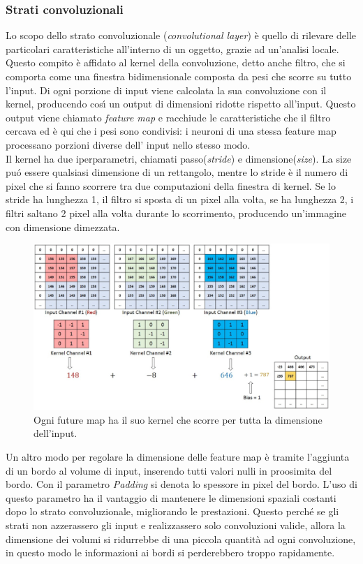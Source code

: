\documentclass[a4paper,12pt]{report}
\begin{document}
\subsubsection{Strati convoluzionali}
Lo scopo dello strato convoluzionale (\textit{convolutional layer}) \`e quello di rilevare delle particolari caratteristiche all'interno di un oggetto, grazie ad un'analisi locale. Questo compito \`e affidato al kernel della convoluzione, detto anche filtro, che si comporta come una finestra bidimensionale composta da pesi che scorre su tutto l'input. Di ogni porzione di input viene calcolata la sua convoluzione con il kernel, producendo cos\'{\i} un output di dimensioni ridotte rispetto all'input. Questo output viene chiamato \textit{feature map} e racchiude le caratteristiche che il filtro cercava ed \`e qui che i pesi sono condivisi: i neuroni di una stessa feature map processano porzioni diverse dell' input nello stesso modo.\\
Il kernel ha due iperparametri, chiamati passo(\textit{stride}) e dimensione(\textit{size}). La size  pu\'{o} essere qualsiasi dimensione di un rettangolo, mentre lo stride \`e il numero di pixel che si fanno scorrere tra due computazioni della finestra di kernel. Se lo stride ha lunghezza 1, il filtro si sposta di un pixel alla volta, se ha lunghezza 2, i filtri saltano 2 pixel alla volta durante lo scorrimento, producendo un'immagine con dimensione dimezzata.
\newpage
\begin{figure}[!ht]
\centering
\includegraphics[scale=0.5]{finestra}
\caption{Ogni future map ha il suo kernel che scorre per tutta la dimensione dell'input.}
\end{figure}
Un altro modo per regolare la dimensione delle feature map \`e tramite l'aggiunta di un bordo al volume di input, inserendo tutti valori nulli in proosimita del bordo. Con il parametro \textit{Padding} si denota lo spessore in pixel del bordo. L'uso di questo parametro ha il vantaggio di mantenere le dimensioni spaziali costanti dopo lo strato convoluzionale, migliorando le prestazioni. Questo perch\'{e} se gli strati non azzerassero gli input e realizzassero solo convoluzioni valide, allora la dimensione dei volumi si ridurrebbe di una piccola quantit\`{a} ad ogni convoluzione, in questo modo le informazioni ai bordi si perderebbero troppo rapidamente.\\
\end{document}
